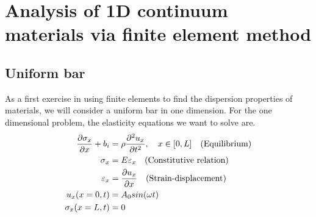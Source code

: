\documentclass{article}
\begin{document}
\section{Analysis of 1D continuum materials via finite element method}
\subsection{Uniform bar}
As a first exercise in using finite elements to find the dispersion properties 
of materials, we will consider a uniform bar in one dimension. For the one 
dimensional problem, the elasticity equations we want to solve are.
\begin{align}
\frac{\partial \sigma_x}{\partial x} + b_i &= \rho \frac{\partial^2 
u_x}{\partial t^2},\quad x\in[0,L]\quad\textnormal{(Equilibrium)} \\
\sigma_x &= E \varepsilon_x\quad\textnormal{(Constitutive relation)}\\
\varepsilon_x &= \frac{\partial u_x}{\partial 
x}\quad\textnormal{(Strain-displacement)}\\
u_x(x=0,t) &= A_0sin(\omega t) \\
\sigma_x(x=L,t) &= 0
\end{align}
\end{document}
